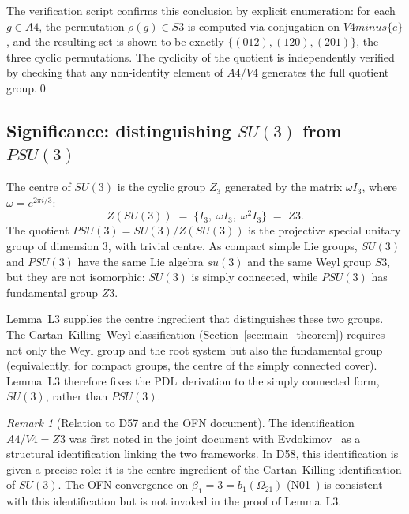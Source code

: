 \documentclass[11pt,a4paper]{article}
\def\Vfour{V4}%
\def\Afour{A4}%
\def\Sthree{S3}%
\def\Zthree{Z3}%
\def\SUthree{SU(3)}%
\def\PSUthree{PSU(3)}%
\def\PDL{PDL}%
\def\cong{=}%
\def\setminus{ minus }%
\def\ZZ{Z}%
\def\suthree{su(3)}%
\def\mathbb#1{#1}%
\def\mathrm#1{#1}%
\def\mathfrak#1{#1}%
\def\textsc#1{#1}%
\theoremstyle{plain}
\theoremstyle{definition}
\theoremstyle{remark}
\newtheorem{remark}[theorem]{Remark}
\newcommand{\PDL}{\textsc{PDL}}
\newcommand{\Afour}{A_4}
\newcommand{\Vfour}{V_4}
\newcommand{\Sthree}{S_3}
\newcommand{\Zthree}{\mathbb{Z}_3}
\newcommand{\SUthree}{\mathrm{SU}(3)}
\newcommand{\PSUthree}{\mathrm{PSU}(3)}
\newcommand{\suthree}{\mathfrak{su}(3)}
\newcommand{\ZZ}{\mathbb{Z}}
\begin{document}
The verification script confirms this conclusion by explicit enumeration: for each $g \in \Afour$, the permutation $\rho(g) \in \Sthree$ is computed via conjugation on $\Vfour \setminus \{e\}$, and the resulting set is shown to be exactly $\{(012), (120), (201)\}$, the three cyclic permutations. The cyclicity of the quotient is independently verified by checking that any non-identity element of $\Afour/\Vfour$ generates the full quotient group.\qed

\subsection{Significance: distinguishing \texorpdfstring{$\SUthree$}{SU(3)} from \texorpdfstring{$\PSUthree$}{PSU(3)}}
\label{subsec:centre_significance}

The centre of $\SUthree$ is the cyclic group $\ZZ_3$ generated by the matrix $\omega I_3$, where $\omega = e^{2\pi i/3}$:
\[
Z(\SUthree) \;=\; \{I_3,\; \omega I_3,\; \omega^2 I_3\} \;\cong\; \Zthree.
\]
The quotient $\PSUthree = \SUthree/Z(\SUthree)$ is the projective special unitary group of dimension 3, with trivial centre. As compact simple Lie groups, $\SUthree$ and $\PSUthree$ have the same Lie algebra $\suthree$ and the same Weyl group $\Sthree$, but they are not isomorphic: $\SUthree$ is simply connected, while $\PSUthree$ has fundamental group $\Zthree$.

Lemma~L3 supplies the centre ingredient that distinguishes these two groups. The Cartan--Killing--Weyl classification (Section~\ref{sec:main_theorem}) requires not only the Weyl group and the root system but also the fundamental group (equivalently, for compact groups, the centre of the simply connected cover). Lemma~L3 therefore fixes the \PDL\ derivation to the simply connected form, $\SUthree$, rather than $\PSUthree$.

\begin{remark}[Relation to D57 and the OFN document]
\label{rem:OFN}
The identification $\Afour/\Vfour \cong \Zthree$ was first noted in the joint document with Evdokimov~\cite{Evdokimov_TwoRoads} as a structural identification linking the two frameworks. In D58, this identification is given a precise role: it is the centre ingredient of the Cartan--Killing identification of $\SUthree$. The OFN convergence on $\beta_1 = 3 = b_1(\Omega_{21})$ (N01~\cite{PDL_N01}) is consistent with this identification but is not invoked in the proof of Lemma~L3.
\end{remark}
\end{document}
